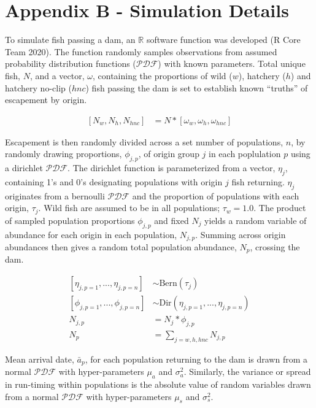 \documentclass[
  12pt,
]{article}
\begin{document}
\hypertarget{append2}{%
\section{Appendix B - Simulation Details}\label{append2}}

To simulate fish passing a dam, an \(\mathbb{R}\) software function was developed (R Core Team 2020). The function randomly samples observations from assumed probability distribution functions (\(\mathcal{PDF}\)) with known parameters. Total unique fish, \(N\), and a vector, \(\omega\), containing the proportions of wild (\(w\)), hatchery (\(h\)) and hatchery no-clip (\(hnc\)) fish passing the dam is set to establish known ``truths'' of escapement by origin.

\[
\begin{aligned}
\left[N_{w}, N_{h}, N_{hnc} \right] &= N * \left[\omega_{w}, \omega_{h}, \omega_{hnc} \right]
\end{aligned}
\]

Escapement is then randomly divided across a set number of populations, \(n\), by randomly drawing proportions, \(\phi_{j,p}\), of origin group \(j\) in each poplulation \(p\) using a dirichlet \(\mathcal{PDF}\). The dirichlet function is parameterized from a vector, \(\eta_j\), containing 1's and 0's designating populations with origin \(j\) fish returning. \(\eta_j\) originates from a bernoulli \(\mathcal{PDF}\) and the proportion of populations with each origin, \(\tau_j\). Wild fish are assumed to be in all populations; \(\tau_w = 1.0\). The product of sampled population proportions \(\phi_{j,p}\) and fixed \(N_j\) yields a random variable of abundance for each origin in each population, \(N_{j,p}\). Summing across origin abundances then gives a random total population abundance, \(N_p\), crossing the dam.

\[
\begin{aligned}
  \left[\eta_{j,p=1},  ... , \eta_{j,p=n}\right] &\sim \text{Bern}(\tau_j) \\
  \left[\phi_{j,p=1},  ... , \phi_{j,p=n}\right] &\sim \text{Dir}(\eta_{j,p=1},  ... , \eta_{j,p=n}) \\
  N_{j,p} &= N_j * \phi_{j,p} \\
  N_p &= \sum_{j=w, h, hnc} N_{j,p}
\end{aligned}
\]

Mean arrival date, \(\bar{a}_p\), for each population returning to the dam is drawn from a normal \(\mathcal{PDF}\) with hyper-parameters \(\mu_a\) and \(\sigma^2_a\). Similarly, the variance or spread in run-timing within populations is the absolute value of random variables drawn from a normal \(\mathcal{PDF}\) with hyper-parameters \(\mu_s\) and \(\sigma^2_s\).
\end{document}
